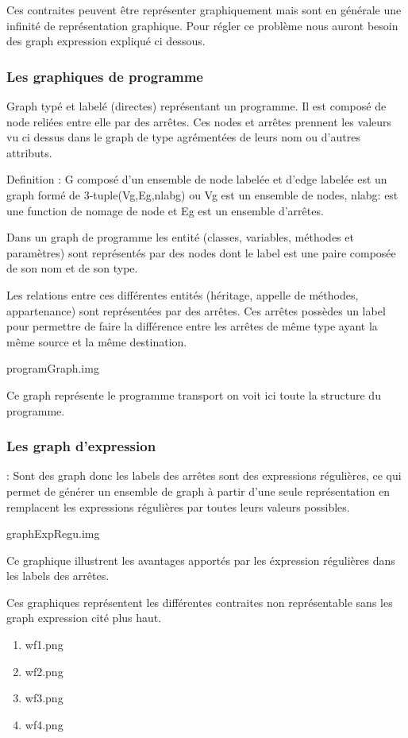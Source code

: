 \documentclass[a4paper, 10pt]{article}
\begin{document}
Ces contraites peuvent être représenter graphiquement mais sont en générale une infinité de représentation graphique.
Pour régler ce problème nous auront besoin des graph expression expliqué ci dessous.

\subsubsection{Les graphiques de programme} 

Graph typé et labelé (directes) représentant un programme. Il est composé de node reliées entre elle par des arrêtes. Ces nodes et arrêtes prennent les valeurs vu ci dessus dans le graph de type agrémentées de leurs nom ou d'autres attributs.

Definition : G composé d'un ensemble de node labelée et d'edge labelée est un graph formé de 3-tuple(Vg,Eg,nlabg) ou Vg est un ensemble de nodes, nlabg: est une function de nomage de node et Eg est un ensemble
d'arrêtes.

Dans un graph de programme les entité (classes, variables, méthodes et paramètres) sont représentés par des nodes dont le label est une paire composée de son nom et de son type.

Les relations entre ces différentes entités (héritage, appelle de méthodes, appartenance) sont représentées par des arrêtes. 
Ces arrêtes possèdes un label pour permettre de faire la différence entre les arrêtes de même type ayant la même source et la même destination.

programGraph.img

Ce graph représente le programme transport on voit ici toute la structure du programme.

\subsubsection{Les graph d'expression} : Sont des graph donc les labels des arrêtes sont des expressions régulières, ce qui permet de générer un ensemble de graph à partir d'une seule représentation en remplacent les expressions régulières par toutes leurs valeurs possibles.

graphExpRegu.img

Ce graphique illustrent les avantages apportés par les éxpression régulières dans les labels des arrêtes.

Ces graphiques représentent les différentes contraites non représentable sans les graph expression cité plus haut.

\begin{enumerate}
\item wf1.png
\item wf2.png
\item wf3.png
\item wf4.png
\end{enumerate}
\end{document}
